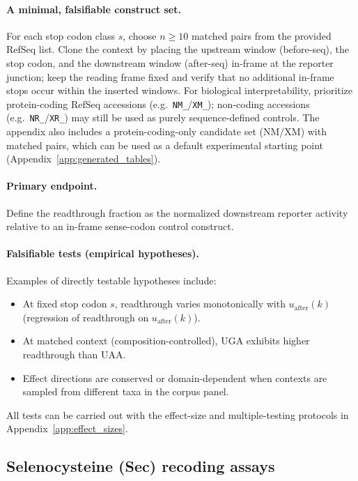 \paragraph{A minimal, falsifiable construct set.}
For each stop codon class $s$, choose $n\ge 10$ matched pairs from the provided RefSeq list.
Clone the context by placing the upstream window (before-seq), the stop codon, and the downstream window (after-seq) in-frame at the reporter junction; keep the reading frame fixed and verify that no additional in-frame stops occur within the inserted windows.
For biological interpretability, prioritize protein-coding RefSeq accessions (e.g.\ \texttt{NM\_}/\texttt{XM\_}); non-coding accessions (e.g.\ \texttt{NR\_}/\texttt{XR\_}) may still be used as purely sequence-defined controls.
The appendix also includes a protein-coding-only candidate set (NM/XM) with matched pairs, which can be used as a default experimental starting point (Appendix~\ref{app:generated_tables}).

\paragraph{Primary endpoint.}
Define the readthrough fraction as the normalized downstream reporter activity relative to an in-frame sense-codon control construct.

\paragraph{Falsifiable tests (empirical hypotheses).}
Examples of directly testable hypotheses include:
\begin{itemize}
\item At fixed stop codon $s$, readthrough varies monotonically with $u_{\mathrm{after}}(k)$ (regression of readthrough on $u_{\mathrm{after}}(k)$).
\item At matched context (composition-controlled), $\mathrm{UGA}$ exhibits higher readthrough than $\mathrm{UAA}$.
\item Effect directions are conserved or domain-dependent when contexts are sampled from different taxa in the corpus panel.
\end{itemize}
All tests can be carried out with the effect-size and multiple-testing protocols in Appendix~\ref{app:effect_sizes}.

\subsection{Selenocysteine (Sec) recoding assays}
\label{app:bio_validation_sec}

